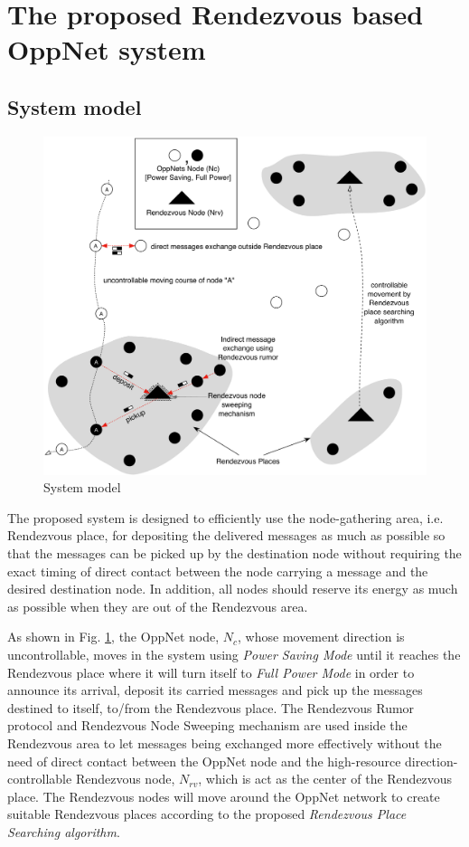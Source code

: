 \documentclass[conference]{IEEEtran}
\begin{document}
\section{The proposed Rendezvous based OppNet system}

\subsection{System model}
\begin{figure}[!t]
	\centering
	\includegraphics[width=5.5in]{Figures/NewSystemModel.pdf}
	\caption{System model}
	\label{System model}
\end{figure}

The proposed system is designed to efficiently use the node-gathering area, i.e. Rendezvous place, for depositing the delivered messages as much as possible so that the messages can be picked up by the destination node without requiring the exact timing of direct contact between the node carrying a message and the desired destination node.
In addition, all nodes should reserve its energy as much as possible when they are out of the Rendezvous area.

As shown in Fig. \ref{System model}, the OppNet node, $N_{c}$, whose movement direction is uncontrollable, moves in the system using \textit{Power Saving Mode}  until it reaches the Rendezvous place where it will turn itself to \emph{Full Power Mode} in order to announce its arrival, deposit its carried messages and pick up the messages destined to itself, to/from the Rendezvous place.
The Rendezvous Rumor protocol and Rendezvous Node Sweeping mechanism are used inside the Rendezvous area to let messages being exchanged more effectively without the need of direct contact between the OppNet node and the high-resource direction-controllable Rendezvous node, $N_{rv}$, which is act as the center of the Rendezvous place.
The Rendezvous nodes will move around the OppNet network to create suitable Rendezvous places according to the proposed \emph{Rendezvous Place Searching algorithm}.
\end{document}
